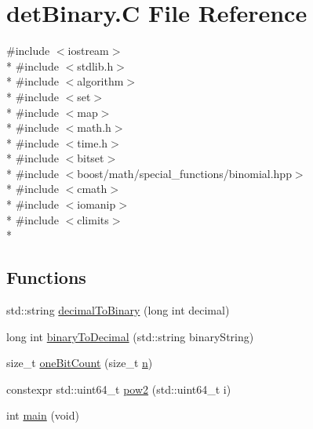 \hypertarget{detBinary_8C}{\section{det\-Binary.\-C File Reference}
\label{detBinary_8C}
}
{\ttfamily \#include $<$iostream$>$}\\*
{\ttfamily \#include $<$stdlib.\-h$>$}\\*
{\ttfamily \#include $<$algorithm$>$}\\*
{\ttfamily \#include $<$set$>$}\\*
{\ttfamily \#include $<$map$>$}\\*
{\ttfamily \#include $<$math.\-h$>$}\\*
{\ttfamily \#include $<$time.\-h$>$}\\*
{\ttfamily \#include $<$bitset$>$}\\*
{\ttfamily \#include $<$boost/math/special\-\_\-functions/binomial.\-hpp$>$}\\*
{\ttfamily \#include $<$cmath$>$}\\*
{\ttfamily \#include $<$iomanip$>$}\\*
{\ttfamily \#include $<$climits$>$}\\*
\subsection*{Functions}
\begin{DoxyCompactItemize}
\item 
std\-::string \hyperlink{detBinary_8C_a49dff28819e0977cdccaeb0bd0594b08}{decimal\-To\-Binary} (long int decimal)
\item 
long int \hyperlink{detBinary_8C_a66f0443bdfa9a6df97f7b679f13ee82d}{binary\-To\-Decimal} (std\-::string binary\-String)
\item 
size\-\_\-t \hyperlink{detBinary_8C_abbaaa9a01b6be36fec4a4641ffef65cb}{one\-Bit\-Count} (size\-\_\-t \hyperlink{detBinary_8C_abe63e991a7bf5d666068b15c9064428d}{n})
\item 
constexpr std\-::uint64\-\_\-t \hyperlink{detBinary_8C_af1df0771f0fa88ba992c6e5fef7aadb9}{pow2} (std\-::uint64\-\_\-t i)
\item 
int \hyperlink{detBinary_8C_a840291bc02cba5474a4cb46a9b9566fe}{main} (void)
\end{DoxyCompactItemize}
